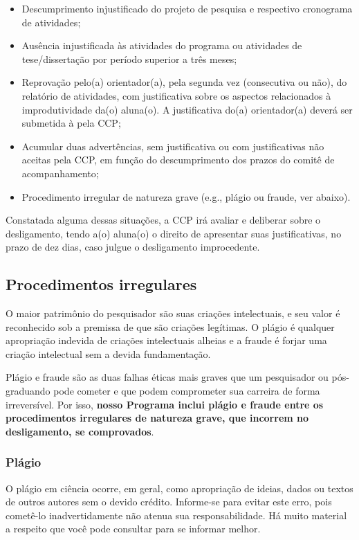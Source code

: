 \documentclass[twoside a4paper 12pt]{report}
\begin{document}
\begin{itemize}
\item Descumprimento injustificado do projeto de pesquisa e respectivo cronograma de atividades;
\item Ausência injustificada às atividades do programa ou atividades de  tese/dissertação por período superior a três meses;
\item Reprovação pelo(a) orientador(a), pela segunda vez (consecutiva ou  não), do relatório de atividades, com justificativa sobre os aspectos  relacionados à improdutividade da(o) aluna(o). A justificativa do(a)  orientador(a) deverá ser submetida à pela CCP;
\item Acumular duas advertências, sem justificativa ou com justificativas não aceitas pela CCP, em função do descumprimento dos prazos do comitê de acompanhamento;
\item Procedimento irregular de natureza grave (e.g., plágio ou fraude, ver abaixo).
\end{itemize}

Constatada alguma dessas situações, a CCP irá avaliar e deliberar sobre o desligamento, tendo a(o) aluna(o) o direito de apresentar suas justificativas, no prazo de dez dias, caso julgue o desligamento improcedente.

\subsection{Procedimentos irregulares}

O maior patrimônio do pesquisador são suas criações intelectuais, e seu valor é reconhecido sob a premissa de que são criações legítimas. O plágio é qualquer apropriação indevida de criações intelectuais alheias e a fraude é forjar uma criação intelectual sem a devida fundamentação.

Plágio e fraude são as duas falhas éticas mais graves que um pesquisador ou pós-graduando pode cometer e que podem comprometer sua carreira de forma irreversível. Por isso, \textbf{nosso Programa inclui plágio e fraude entre os procedimentos irregulares de natureza grave, que incorrem no desligamento, se comprovados}.

\subsubsection{Plágio}
O plágio em ciência ocorre, em geral, como apropriação de ideias, dados ou textos de outros autores sem o devido crédito. Informe-se para evitar este erro, pois cometê-lo inadvertidamente não atenua sua responsabilidade. Há muito material a respeito que você pode consultar para se informar melhor.
\end{document}
